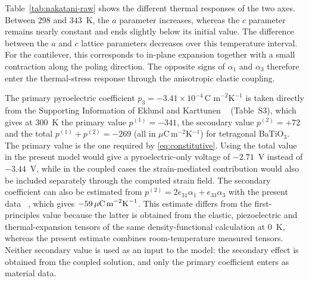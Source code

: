 \documentclass[a4paper,12pt]{elsarticle}
\begin{document}
Table~\ref{tab:nakatani-raw} shows the different thermal responses of the two axes.
Between 298 and 343~K, the $a$ parameter increases, whereas the $c$ parameter remains
nearly constant and ends slightly below its initial value. The difference between the $a$ and $c$ lattice parameters decreases over
this temperature interval. For the cantilever,
this corresponds to in-plane expansion together with a small contraction along the
poling direction. The opposite signs of $\alpha_1$ and $\alpha_3$ therefore enter the
thermal-stress response through the anisotropic elastic coupling.

The primary pyroelectric coefficient
$p_3=-3.41\times10^{-4}\,\text{C m}^{-2}\text{K}^{-1}$
is taken directly from the Supporting Information of Eklund and Karttunen
~\cite{EklundKarttunen2023} (Table~S3), which gives at 300~K the primary value
$p^{(1)}=-341$, the secondary value $p^{(2)}=+72$ and the total
$p^{(1)}+p^{(2)}=-269$ (all in $\mu$C\,m$^{-2}$K$^{-1}$) for tetragonal BaTiO$_3$.
The primary value is the one required by \eqref{eq:constitutive}. Using the total value
in the present model would give a pyroelectric-only voltage of $-2.71$~V instead of
$-3.44$~V, while in the coupled cases the strain-mediated contribution would also be
included separately through the computed strain field. The secondary coefficient can
also be estimated from
$p^{(2)}=2e_{31}\alpha_1+e_{33}\alpha_3$
with the present data ~\cite{Zgonik1994,Nakatani2016}, which gives
$-59\,\mu\text{C\,m}^{-2}\text{K}^{-1}$. This estimate differs from the
first-principles value because the latter is obtained from the elastic, piezoelectric
and thermal-expansion tensors of the same density-functional calculation at 0~K,
whereas the present estimate combines room-temperature measured tensors. Neither
secondary value is used as an input to the model: the secondary effect is obtained from
the coupled solution, and only the primary coefficient enters as material data.
\end{document}
